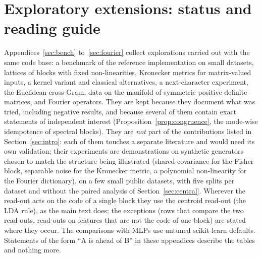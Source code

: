 \documentclass[11pt,a4paper]{article}
\theoremstyle{plain}
\theoremstyle{definition}
\theoremstyle{remark}
\begin{document}
\section{Exploratory extensions: status and reading guide}
\label{sec:extensions}
Appendices~\ref{sec:bench} to~\ref{sec:fourier} collect explorations
carried out with the same code base: a benchmark of the reference
implementation on small datasets, lattices of blocks with fixed
non-linearities, Kronecker metrics for matrix-valued inputs, a kernel
variant and classical alternatives, a next-character experiment, the
Euclidean cross-Gram, data on the manifold of symmetric positive definite
matrices, and Fourier operators. They are kept because they document what
was tried, including negative results, and because several of them contain
exact statements of independent interest (Proposition~\ref{prop:congruence},
the mode-wise idempotence of spectral blocks). They are \emph{not} part of
the contributions listed in Section~\ref{sec:intro}: each of them touches a
separate literature and would need its own validation; their experiments
are demonstrations on synthetic generators chosen to match the structure
being illustrated (shared covariance for the Fisher block, separable noise
for the Kronecker metric, a polynomial non-linearity for the Fourier
dictionary), on a few small public datasets, with five splits per dataset
and without the paired analysis of Section~\ref{sec:central}. Wherever the
read-out acts on the code of a single block they use the centroid read-out
(the LDA rule), as the main text does; the exceptions (rows that compare
the two read-outs, read-outs on features that are not the code of one
block) are stated where they occur. The comparisons with MLPs use untuned
scikit-learn defaults. Statements of the form ``A is ahead of B'' in these
appendices describe the tables and nothing more.

\end{document}
